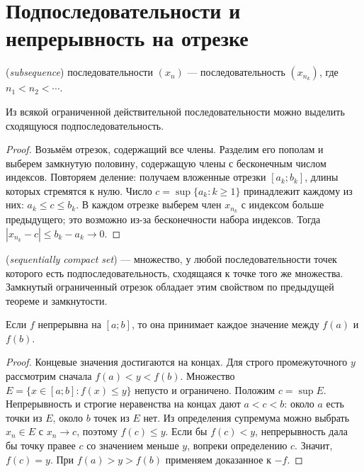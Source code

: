 \section{Подпоследовательности и непрерывность на отрезке}
\begin{definition}
 (\emph{subsequence}) последовательности \((x_n)\) — последовательность \((x_{n_k})\), где \(n_1<n_2<\cdots\).
\end{definition}
\begin{theorem}\label{thm:legacy-c28-6}
Из всякой ограниченной действительной последовательности можно выделить сходящуюся подпоследовательность.
\end{theorem}
\begin{proof}
Возьмём отрезок, содержащий все члены. Разделим его пополам и выберем замкнутую половину, содержащую члены с бесконечным числом индексов. Повторяем деление: получаем вложенные отрезки \([a_k;b_k]\), длины которых стремятся к нулю. Число \(c=\sup\{a_k:k\ge1\}\) принадлежит каждому из них: \(a_k\le c\le b_k\). В каждом отрезке выберем член \(x_{n_k}\) с индексом больше предыдущего; это возможно из-за бесконечности набора индексов. Тогда \(|x_{n_k}-c|\le b_k-a_k\to0\).
\end{proof}
\begin{definition}
 (\emph{sequentially compact set}) — множество, у любой последовательности точек которого есть подпоследовательность, сходящаяся к точке того же множества. Замкнутый ограниченный отрезок обладает этим свойством по предыдущей теореме и замкнутости.
\end{definition}

\begin{theorem}\label{thm:legacy-c28-7}
Если \(f\) непрерывна на \([a;b]\), то она принимает каждое значение между \(f(a)\) и \(f(b)\).
\end{theorem}
\begin{proof}
Концевые значения достигаются на концах. Для строго промежуточного \(y\) рассмотрим сначала \(f(a)<y<f(b)\). Множество \(E=\{x\in[a;b]:f(x)\le y\}\) непусто и ограничено. Положим \(c=\sup E\). Непрерывность и строгие неравенства на концах дают \(a<c<b\): около \(a\) есть точки из \(E\), около \(b\) точек из \(E\) нет. Из определения супремума можно выбрать \(x_n\in E\) с \(x_n\to c\), поэтому \(f(c)\le y\). Если бы \(f(c)<y\), непрерывность дала бы точку правее \(c\) со значением меньше \(y\), вопреки определению \(c\). Значит, \(f(c)=y\). При \(f(a)>y>f(b)\) применяем доказанное к \(-f\).
\end{proof}

